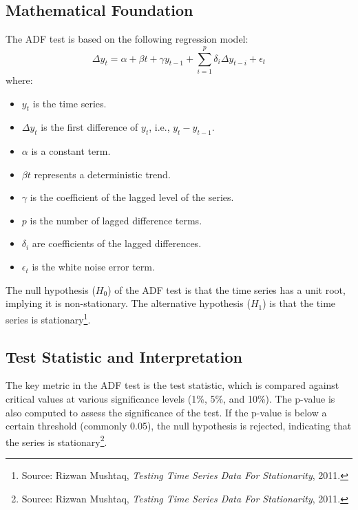 \documentclass{article}
\begin{document}
\subsection*{Mathematical Foundation}
The ADF test is based on the following regression model:
\[
\Delta y_t = \alpha + \beta t + \gamma y_{t-1} + \sum_{i=1}^p \delta_i \Delta y_{t-i} + \epsilon_t
\]
where:
\begin{itemize}
    \item \( y_t \) is the time series.
    \item \( \Delta y_t \) is the first difference of \( y_t \), i.e., \( y_t - y_{t-1} \).
    \item \( \alpha \) is a constant term.
    \item \( \beta t \) represents a deterministic trend.
    \item \( \gamma \) is the coefficient of the lagged level of the series.
    \item \( p \) is the number of lagged difference terms.
    \item \( \delta_i \) are coefficients of the lagged differences.
    \item \( \epsilon_t \) is the white noise error term.
\end{itemize}

The null hypothesis (\(H_0\)) of the ADF test is that the time series has a unit root, implying it is non-stationary. The alternative hypothesis (\(H_1\)) is that the time series is stationary\footnote{Source: Rizwan Mushtaq, \textit{Testing Time Series Data For Stationarity}, 2011.}.

\subsection*{Test Statistic and Interpretation}
The key metric in the ADF test is the test statistic, which is compared against critical values at various significance levels (1\%, 5\%, and 10\%). The p-value is also computed to assess the significance of the test. If the p-value is below a certain threshold (commonly 0.05), the null hypothesis is rejected, indicating that the series is stationary\footnote{Source: Rizwan Mushtaq, \textit{Testing Time Series Data For Stationarity}, 2011.}.
\end{document}
